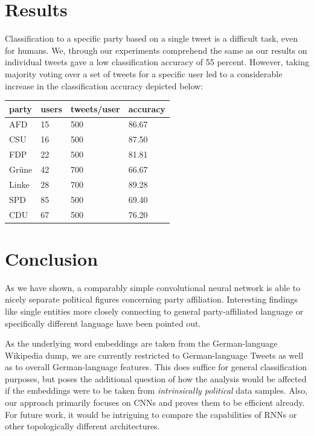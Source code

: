 \documentclass[10pt, oneside]{article}
\begin{document}
\begin{multicols}{2}
\section{Results}
Classification to a specific party based on a single tweet is a difficult task, even for humans. We, through our experiments comprehend the same as our results on individual tweets gave a low classification accuracy of 55 percent.
However, taking majority voting over a set of tweets for a specific user led to a considerable increase in the classification accuracy depicted below:
\begin{center}
	\begin{tabular}{|l|l|l|l|}
	\hline
	\textbf{party} & \textbf{users} & \textbf{tweets/user} & \textbf{accuracy} \\ \hline
	AFD & 15 & 500 & 86.67 \\
	CSU & 16 & 500 & 87.50 \\
	FDP & 22 & 500 & 81.81 \\
	Grüne & 42 & 700 & 66.67 \\
	Linke & 28 & 700 & 89.28 \\
	SPD & 85 & 500 & 69.40 \\
	CDU & 67 & 500 & 76.20 \\
	\hline
	\end{tabular}
\end{center}


\section{Conclusion}

As we have shown, a comparably simple convolutional neural network is able to nicely separate political figures concerning party affiliation. Interesting findings like single entities more closely connecting to general party-affiliated language or specifically different language have been pointed out.

As the underlying word embeddings are taken from the German-language Wikipedia dump, we are currently restricted to German-language Tweets as well as to overall German-language features. This does suffice for general classification purposes, but poses the additional question of how the analysis would be affected if the embeddings were to be taken from \emph{intrinsically political} data samples. 
Also, our approach primarily focuses on CNNs and proves them to be efficient already. For future work, it would be intriguing to compare the capabilities of RNNs or other topologically different architectures. 


\end{multicols}



\end{document}
